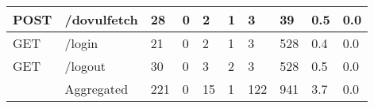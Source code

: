 \begin{table*}[h]
\begin{tabular}{|p{}|p{}|p{}|p{}|p{}|p{}|p{}|p{}|p{}|p{}|}
  POST                                  & /dovulfetch                        & 28                                        & 0                                      & 2                                          & 1                                      & 3                                      & 39                                                 & 0.5                               & 0.0                                      \\ \hline
  GET                                   & /login                             & 21                                        & 0                                      & 2                                          & 1                                      & 3                                      & 528                                                & 0.4                               & 0.0                                      \\ \hline
  GET                                   & /logout                            & 30                                        & 0                                      & 3                                          & 2                                      & 3                                      & 528                                                & 0.5                               & 0.0                                      \\ \hline
                                        & Aggregated                         & 221                                       & 0                                      & 15                                         & 1                                      & 122                                    & 941                                                & 3.7                               & 0.0                                      \\ \hline
  \end{tabular}
  \end{table*}